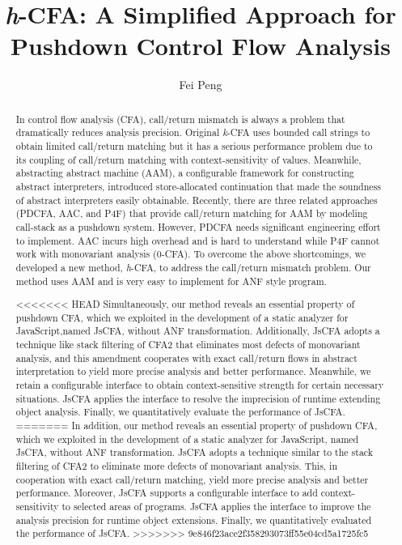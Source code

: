 \documentclass{article}
\title{\textit{h}-CFA\@: A Simplified Approach for\\ Pushdown Control Flow Analysis}
\author{Fei Peng}
\begin{document}
\maketitle
\begin{abstract}
  In control flow analysis (CFA), call/return mismatch is always a problem that dramatically reduces analysis precision.
  Original \textit{k}-CFA uses bounded call strings to obtain limited call/return matching but it has a serious performance problem
  due to its coupling of call/return matching with context-sensitivity of values.
  Meanwhile, abstracting abstract machine (AAM), a configurable framework for constructing abstract interpreters,
  introduced store-allocated continuation that made the soundness of abstract interpreters easily obtainable.
  Recently, there are three related approaches (PDCFA, AAC, and P4F) that provide call/return matching for AAM by modeling call-stack as a pushdown system.
  However, PDCFA needs significant engineering effort to implement.
  AAC incurs high overhead and is hard to understand while P4F cannot work with monovariant analysis (0-CFA).
  To overcome the above shortcomings, we developed a new method, \textit{h}-CFA, to address the call/return mismatch problem.
  Our method uses AAM and is very easy to implement for ANF style program.

<<<<<<< HEAD
  Simultaneously, our method reveals an essential property of pushdown CFA,
  which we exploited in the development of a static analyzer for JavaScript,named JsCFA, without ANF transformation.
  Additionally, JsCFA adopts a technique like stack filtering of CFA2 that eliminates most defects of monovariant analysis, and this amendment cooperates with exact call/return flows in abstract interpretation to yield more precise analysis and better performance.
  Meanwhile, we retain a configurable interface to obtain context-sensitive strength for certain necessary situations.
  JsCFA applies the interface to resolve the imprecision of runtime extending object analysis. Finally, we quantitatively evaluate the performance of JsCFA.
=======
  In addition, our method reveals an essential property of pushdown CFA,
  which we exploited in the development of a static analyzer for JavaScript, named JsCFA, without ANF transformation.
  JsCFA adopts a technique similar to the stack filtering of CFA2 to eliminate more defects of monovariant analysis. 
  This, in cooperation with exact call/return matching, yield more precise analysis and better performance.
  Moreover, JsCFA supports a configurable interface to add context-sensitivity to selected areas of programs.
  JsCFA applies the interface to improve the analysis precision for runtime object extensions. 
  Finally, we quantitatively evaluated the performance of JsCFA.%
>>>>>>> 9e846f23ace2f358293073ff55e04cd5a1725fc5
\end{abstract}
\end{document}
